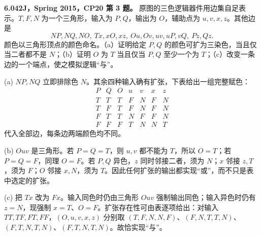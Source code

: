 \begin{exercise}\label{mit:6042-cp20-q3}
\textbf{6.042J，Spring 2015，CP20 第 3 题。}
原图的三色逻辑器件用边集自足表示。$T,F,N$ 为一个三角形，输入为 $P,Q$，输出为 $O$，辅助点为 $u,v,x,z$。其他边是
\[
NP,NQ,NO,\ Tx,xO,xz,\ Ou,Ov,uv,uP,vQ,\ Pz,Qz.
\]
颜色以三角形顶点的颜色命名。（a）证明给定 $P,Q$ 的颜色可扩为三染色，当且仅当二者都不是 $N$；（b）证明 $O$ 为 $T$ 当且仅当 $P,Q$ 至少一个为 $T$；（c）改变一条边的一个端点，使之模拟逻辑“与”。
\end{exercise}
\begin{solution}
(a) $NP,NQ$ 立即排除色 $N$。其余四种输入确有扩张，下表给出一组完整赋色：
\[
\begin{array}{cc|ccccc}
P&Q&O&u&v&x&z\\\hline
T&T&T&F&N&F&N\\T&F&T&F&N&F&N\\
F&T&T&N&F&F&N\\F&F&F&T&N&N&T
\end{array}
\]
代入全部边，每条边两端颜色均不同。

(b) $Ouv$ 是三角形。若 $P=Q=T$，则 $u,v$ 都不能为 $T$，所以 $O=T$；若 $P=Q=F$，同理 $O=F$。若 $P,Q$ 异色，$z$ 同时邻接二者，须为 $N$；$x$ 邻接 $z,T$，须为 $F$；$O$ 邻接 $x,N$，须为 $T$。因此任何扩张的输出都实现“或”，而不只是表中选定的扩张。

(c) 把 $Tx$ 改为 $Fx$。输入同色时仍由三角形 $Ouv$ 强制输出同色；输入异色时仍有 $z=N$，现强制 $x=T$、$O=F$。扩张存在性可由表逐项给出：对输入 $TT,TF,FT,FF$，$(O,u,v,x,z)$ 分别取 $(T,F,N,N,F)$、$(F,N,T,T,N)$、$(F,T,N,T,N)$、$(F,T,N,T,N)$。故恰实现“与”。
\end{solution}

